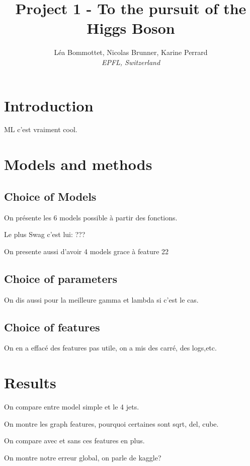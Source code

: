 \documentclass[10pt,conference,compsocconf]{IEEEtran}
\begin{document}
\title{Project 1 - To the pursuit of the Higgs Boson}

\author{
  L\'ea Bommottet, Nicolas Brunner, Karine Perrard\\
  \textit{ EPFL, Switzerland}
}

\maketitle

\section{Introduction}

ML c'est vraiment cool.


\section{Models and methods}

\subsection{Choice of Models}
On pr\'esente les 6 models possible \`a partir des fonctions.

Le plus Swag c'est lui: ???

On presente aussi d'avoir 4 models grace \`a feature 22

\subsection{Choice of parameters}
On dis aussi pour la meilleure gamma et lambda si c'est le cas.

\subsection{Choice of features}
On en a effac\'e des features pas utile, on a mis des carr\'e, des logs,etc.
\section{Results}
On compare entre model simple et le 4 jets.

On montre les graph features, pourquoi certaines sont sqrt, del, cube.

On compare avec et sans ces features en plus.

On montre notre erreur global, on parle de kaggle?
\end{document}
